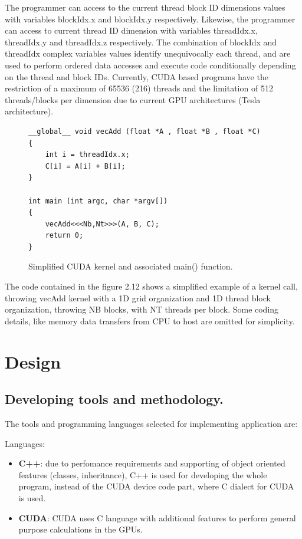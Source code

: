 \documentclass[thesis=M,english]{FITthesis}[2011/07/15]
\begin{document}
The programmer can access to the current thread block ID dimensions values with variables blockIdx.x and blockIdx.y respectively. Likewise, the programmer can access to current thread ID dimension with variables threadIdx.x, threadIdx.y and threadIdx.z respectively. The combination of blockIdx and threadIdx complex variables values identify unequivocally each thread, and are used to perform ordered data accesses and execute code conditionally depending on the thread and block IDs. Currently, CUDA based programs have the restriction of a maximum of 65536 (216) threads and the limitation of 512 threads/blocks per dimension due to current GPU architectures (Tesla architecture).

\begin{figure}[h]
\begin{lstlisting}
__global__ void vecAdd (float *A , float *B , float *C)
{
	int i = threadIdx.x;
	C[i] = A[i] + B[i];
}

int main (int argc, char *argv[])
{
	vecAdd<<<Nb,Nt>>>(A, B, C);
	return 0;
}

\end{lstlisting}
\caption{Simplified CUDA kernel and associated main() function.}
\label{fig:cuda_threads}
\end{figure}

The code contained in the figure 2.12 shows a simplified example of a kernel call, throwing vecAdd kernel with a 1D grid organization and 1D thread block organization, throwing NB blocks, with NT threads per block. Some coding details, like memory data transfers from CPU to host are omitted for simplicity.


\chapter{Design}

\section{Developing tools and methodology.}
The tools and programming languages selected for implementing application are:

Languages:

\begin{itemize}
\item \textbf{C++}: due to perfomance requirements and supporting of object oriented features (classes, inheritance), C++ is used for developing the whole program, instead of the CUDA device code part, where C dialect for CUDA is used.
\item \textbf{CUDA}: CUDA uses C language with additional features to perform general purpose calculations in the GPUs.
\end{itemize}
\end{document}
